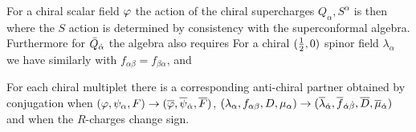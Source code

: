 For a chiral scalar field ${\varphi}$ the action of the chiral supercharges
$Q_\alpha, S^\alpha$ is then
\eqn{}
where the $S$ action is determined by consistency with the superconformal algebra.
Furthermore for $\bar Q_{\smash {{\dot \alpha}}}$ the algebra also requires
\eqn{}
For a chiral $({\textstyle {1 \over 2}},0)$ spinor field $\lambda_\alpha$ we have similarly
\eqn{}
with $f_{\alpha\beta}= f_{\beta\alpha}$, and
\eqn{}

For each chiral multiplet there is a corresponding anti-chiral partner obtained
by conjugation when $({\varphi},\psi_\alpha,F)\to ({{\overline {{\varphi}}}},{\overline \psi}{}_{\dot \alpha},{\overline F})$,
$(\lambda_{\alpha},f_{\alpha\beta},{\sl D},\mu_\alpha) \to ({\overline \lambda}_{\dot \alpha},
{\overline f}{}_{\smash{{\dot \alpha}{\dot \beta}}},{\overline {{\sl D}}},{\overline \mu}{}_{\smash{{\dot \alpha}}})$ and when the
$R$-charges change sign.

